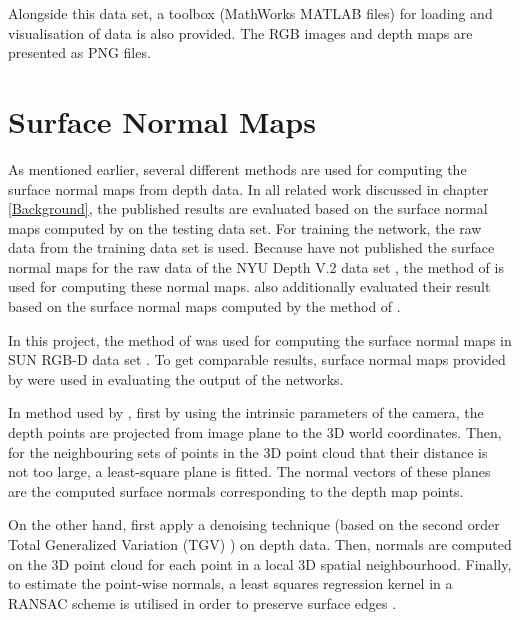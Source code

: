 Alongside this data set, a toolbox (MathWorks MATLAB files) for loading and visualisation of data is also provided. The RGB images and depth maps are presented as PNG files.    

\section{Surface Normal Maps} \label{sec:surfnormmap}

As mentioned earlier, several different methods are used for computing the surface normal maps from depth data. In all related work discussed in chapter \ref{Background}, the published results are evaluated based on the surface normal maps computed by \citeauthor*{ladicky} \cite{ladicky} on the testing data set. For training the network, the raw data from the training data set is used. Because \citeauthor*{ladicky} have not published the surface normal maps for the raw data of the NYU Depth V.2 data set \cite{silberman}, the method of \citeauthor*{silberman} \cite{silberman} is used for computing these normal maps. \citeauthor*{dharmasiri} \cite{dharmasiri} also additionally evaluated their result based on the surface normal maps computed by the method of \citeauthor*{spek} \cite{spek}. 

\pagebreak

In this project, the method of \citeauthor*{silberman} \cite{silberman} was used for computing the surface normal maps in SUN RGB-D data set \cite{sun}. To get comparable results, surface normal maps provided by \citeauthor*{ladicky} \cite{ladicky} were used in evaluating the output of the networks.

In method used by \citeauthor*{silberman} \cite{silberman}, first by using the intrinsic parameters of the camera, the depth points are projected from image plane to the 3D world coordinates. Then, for the neighbouring sets of points in the 3D point cloud that their distance is not too large, a least-square plane is fitted. The normal vectors of these planes are the computed surface normals corresponding to the depth map points.  

On the other hand, \citeauthor*{ladicky} \cite{ladicky} first apply a denoising technique (based on the second order Total Generalized Variation (TGV) \cite{tgv}) on depth data. Then, normals are computed on the 3D point cloud for each point in a local 3D spatial neighbourhood. Finally, to estimate the point-wise normals, a least squares regression kernel in a RANSAC scheme is utilised in order to preserve surface edges \cite[p.~10]{ladicky}. 

